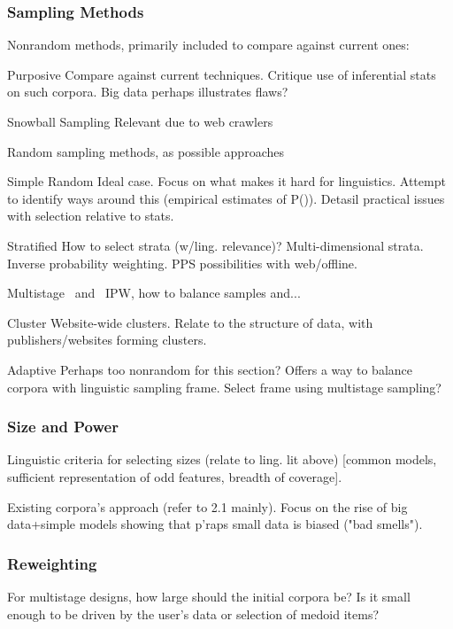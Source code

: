 \subsubsection{Sampling Methods}
Nonrandom methods, primarily included to compare against current ones:
\begin{itemizeTitle}
    \item[Purposive] Compare against current techniques.  Critique use of inferential stats on such corpora.  Big data perhaps illustrates flaws?
    \item[Snowball Sampling] Relevant due to web crawlers
\end{itemizeTitle}
Random sampling methods, as possible approaches
\begin{itemizeTitle}
    \item[Simple Random] Ideal case.  Focus on what makes it hard for linguistics.  Attempt to identify ways around this (empirical estimates of P()). Detasil practical issues with selection relative to stats.  
    \item[Stratified] How to select strata (w/ling. relevance)? Multi-dimensional strata. Inverse probability weighting.  PPS possibilities with web/offline.
    \item[Multistage ~and~] IPW, how to balance samples and...
    \item[Cluster] Website-wide clusters.  Relate to the structure of data, with publishers/websites forming clusters.
    \item[Adaptive] Perhaps too nonrandom for this section?  Offers a way to balance corpora with linguistic sampling frame.  Select frame using multistage sampling?
\end{itemizeTitle}

\subsubsection{Size and Power}
Linguistic criteria for selecting sizes (relate to ling. lit above) [common models, sufficient representation of odd features, breadth of coverage].

Existing corpora's approach (refer to 2.1 mainly).  Focus on the rise of big data+simple models showing that p'raps small data is biased ("bad smells").
\subsubsection{Reweighting}
For multistage designs, how large should the initial corpora be? Is it small enough to be driven by the user's data or selection of medoid items?

